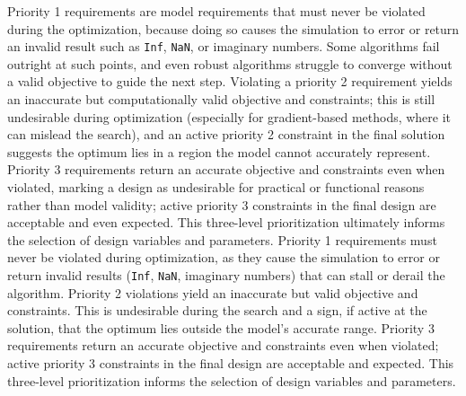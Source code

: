 \ifdefined\DISSERTATION
    \normalspacing
\fi
\ifdefined\DISSERTATION
    Priority 1 requirements are model requirements that must never be violated during the optimization, because doing so causes the simulation to error or return an invalid result such as \texttt{Inf}, \texttt{NaN}, or imaginary numbers.
    Some algorithms fail outright at such points, and even robust algorithms struggle to converge without a valid objective to guide the next step.
    Violating a priority 2 requirement yields an inaccurate but computationally valid objective and constraints; this is still undesirable during optimization (especially for gradient-based methods, where it can mislead the search), and an active priority 2 constraint in the final solution suggests the optimum lies in a region the model cannot accurately represent.
    Priority 3 requirements return an accurate objective and constraints even when violated, marking a design as undesirable for practical or functional reasons rather than model validity; active priority 3 constraints in the final design are acceptable and even expected.
    This three-level prioritization ultimately informs the selection of design variables and parameters.
\else
    Priority 1 requirements must never be violated during optimization, as they cause the simulation to error or return invalid results (\texttt{Inf}, \texttt{NaN}, imaginary numbers) that can stall or derail the algorithm.
    Priority 2 violations yield an inaccurate but valid objective and constraints.
    This is undesirable during the search and a sign, if active at the solution, that the optimum lies outside the model's accurate range.
    Priority 3 requirements return an accurate objective and constraints even when violated; active priority 3 constraints in the final design are acceptable and expected.
    This three-level prioritization informs the selection of design variables and parameters.
\fi

